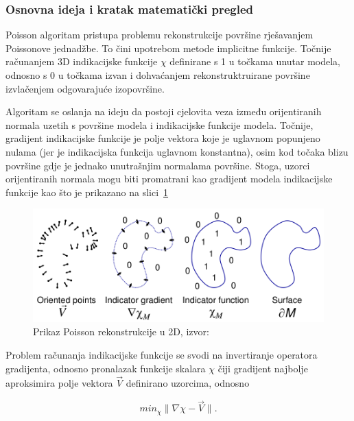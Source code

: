 \subsubsection{Osnovna ideja i kratak matematički pregled} %
\label{ssub:Osnovna ideja i kratak matematički pregled}

Poisson algoritam pristupa problemu rekonstrukcije površine rješavanjem
Poissonove jednadžbe. To čini upotrebom metode implicitne funkcije.
Točnije računanjem 3D indikacijske funkcije \(\chi\) definirane s 1 u
točkama unutar modela, odnosno s 0 u točkama izvan i dohvaćanjem
rekonstruktruirane površine izvlačenjem odgovarajuće izopovršine.

Algoritam se oslanja na ideju da postoji cjelovita veza između
orijentiranih normala uzetih s površine modela i indikacijske funkcije
modela. Točnije, gradijent indikacijske funkcije je polje vektora koje
je uglavnom popunjeno nulama (jer je indikacijska funkcija uglavnom
konstantna), osim kod točaka blizu površine gdje je jednako unutrašnjim
normalama površine. Stoga, uzorci orijentiranih normala mogu biti
promatrani kao gradijent modela indikacijske funkcije kao što je
prikazano na slici~\ref{fig:poisson-reconstruction.png}

\begin{figure}[h]
\centering
\includegraphics[scale=0.35]{figures/poisson-reconstruction.png}
\caption[]{Prikaz Poisson rekonstrukcije u 2D,
    izvor:~\cite{Kazhdan:2006}}
\label{fig:poisson-reconstruction.png}
\end{figure}

Problem računanja indikacijske funkcije se svodi na invertiranje
operatora gradijenta, odnosno pronalazak funkcije skalara \(\chi\) čiji
gradijent najbolje aproksimira polje vektora \(\vec{V}\) definirano
uzorcima, odnosno 

\begin{equation*}
min_\chi \|\nabla\chi - \vec{V}\|.
\end{equation*}

